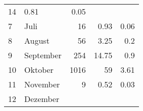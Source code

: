 \begin{longtable}{lXrrr}
       \num{14} &
       \num[round-mode=places,round-precision=2]{0,81} &
         \num[round-mode=places,round-precision=2]{0,05} \\

     7 &
     \multicolumn{1}{X}{ Juli   } &


       \num{16} &
       \num[round-mode=places,round-precision=2]{0,93} &
         \num[round-mode=places,round-precision=2]{0,06} \\

     8 &
     \multicolumn{1}{X}{ August   } &


       \num{56} &
       \num[round-mode=places,round-precision=2]{3,25} &
         \num[round-mode=places,round-precision=2]{0,2} \\

     9 &
     \multicolumn{1}{X}{ September   } &


       \num{254} &
       \num[round-mode=places,round-precision=2]{14,75} &
         \num[round-mode=places,round-precision=2]{0,9} \\

     10 &
     \multicolumn{1}{X}{ Oktober   } &


       \num{1016} &
       \num[round-mode=places,round-precision=2]{59} &
         \num[round-mode=places,round-precision=2]{3,61} \\

     11 &
     \multicolumn{1}{X}{ November   } &


       \num{9} &
       \num[round-mode=places,round-precision=2]{0,52} &
         \num[round-mode=places,round-precision=2]{0,03} \\

     12 &
     \multicolumn{1}{X}{ Dezember   } &



\end{longtable}
